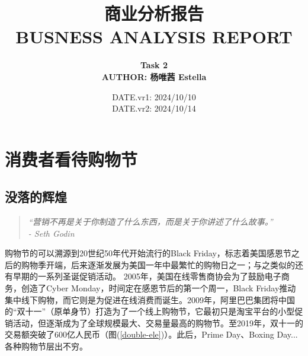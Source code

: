 \documentclass[12pt]{ctexart}
\title{
\Huge{\textbf{商业分析报告}}\\
\Large{\textbf{BUSNESS ANALYSIS REPORT}}\\
\vspace{8mm}
}
\author{\textbf{Task 2} \\
\textbf{AUTHOR: 杨唯茜 Estella}\\
}
\date{DATE.vr1: 2024/10/10 \\
      DATE.vr2: 2024/10/14}
\begin{document}
\maketitle
\thispagestyle{empty} %

\vspace{5mm}





\newpage
\clearpage
\thispagestyle{empty}
\thispagestyle{empty} %
\begin{titlepage}
{
\clearpage
\thispagestyle{empty}
  \color{black}
  \tableofcontents
}
\end{titlepage}
\newpage


\pagestyle{plain} 

\clearpage %

\section{消费者看待购物节}

\subsection{没落的辉煌}
\begin{quote}
    \textit{“营销不再是关于你制造了什么东西，而是关于你讲述了什么故事。”} \\
    \raggedleft \textit{- Seth Godin}
\end{quote}

购物节的可以溯源到20世纪50年代开始流行的Black Friday，标志着美国感恩节之后的购物季开端，后来逐渐发展为美国一年中最繁忙的购物日之一；与之类似的还有早期的一系列圣诞促销活动。 2005年，美国在线零售商协会为了鼓励电子商务，创造了Cyber Monday，时间定在感恩节后的第一个周一，Black Friday推动集中线下购物，而它则是为促进在线消费而诞生。2009年，阿里巴巴集团将中国的“双十一”（原单身节）打造为了一个线上购物节，它最初只是淘宝平台的小型促销活动，但逐渐成为了全球规模最大、交易量最高的购物节。至2019年，双十一的交易额突破了600亿人民币（图(\ref{double-ele})）。此后，Prime Day、Boxing Day...各种购物节层出不穷。
\end{document}
